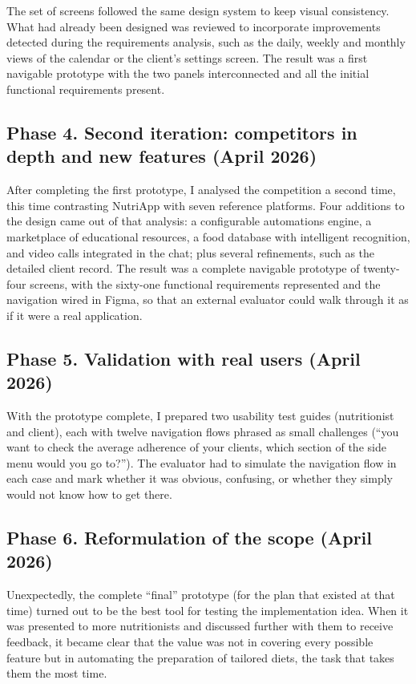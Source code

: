 The set of screens followed the same design system to keep visual consistency. What had already been designed was reviewed to incorporate improvements detected during the requirements analysis, such as the daily, weekly and monthly views of the calendar or the client's settings screen. The result was a first navigable prototype with the two panels interconnected and all the initial functional requirements present.

\subsection*{Phase 4. Second iteration: competitors in depth and new features (April 2026)}

After completing the first prototype, I analysed the competition a second time, this time contrasting NutriApp with seven reference platforms. Four additions to the design came out of that analysis: a configurable automations engine, a marketplace of educational resources, a food database with intelligent recognition, and video calls integrated in the chat; plus several refinements, such as the detailed client record. The result was a complete navigable prototype of twenty-four screens, with the sixty-one functional requirements represented and the navigation wired in Figma, so that an external evaluator could walk through it as if it were a real application.

\subsection*{Phase 5. Validation with real users (April 2026)}

With the prototype complete, I prepared two usability test guides (nutritionist and client), each with twelve navigation flows phrased as small challenges (``you want to check the average adherence of your clients, which section of the side menu would you go to?''). The evaluator had to simulate the navigation flow in each case and mark whether it was obvious, confusing, or whether they simply would not know how to get there.

\subsection*{Phase 6. Reformulation of the scope (April 2026)}
Unexpectedly, the complete ``final'' prototype (for the plan that existed at that time) turned out to be the best tool for testing the implementation idea. When it was presented to more nutritionists and discussed further with them to receive feedback, it became clear that the value was not in covering every possible feature but in automating the preparation of tailored diets, the task that takes them the most time.

